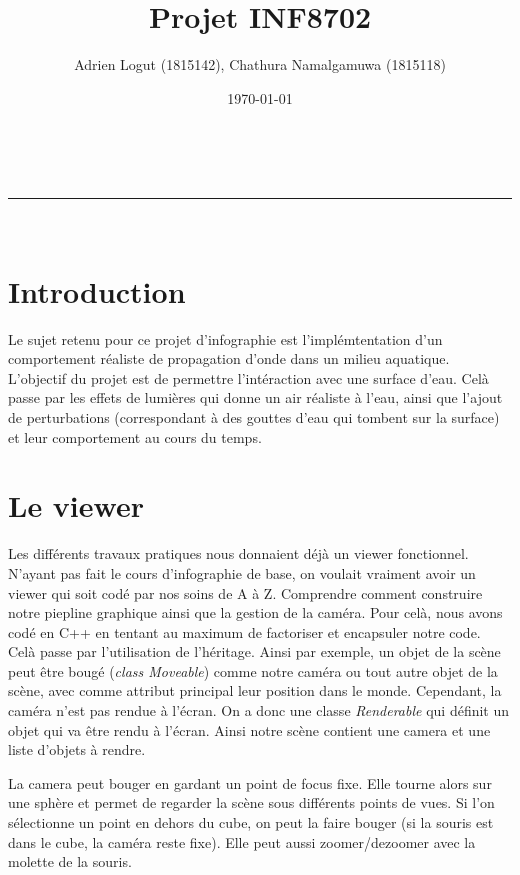 \documentclass[a4paper,11pt,leqno]{article}
\makeatletter
\newcommand{\linia}{\rule{\linewidth}{0.5pt}}
\renewcommand{\maketitle}{
\begin{center}
\vspace{2ex}
{\huge \textsc{\@title}}
\vspace{1ex}
\\
\linia\\
\@author
\vspace{4ex}
\end{center}
}
\makeatother
\begin{document}
\renewcommand{\proofname}{Preuve}

\title{Projet INF8702}

\author{Adrien Logut (1815142), Chathura Namalgamuwa (1815118)}

\date{\today}

\maketitle

\section*{Introduction}

Le sujet retenu pour ce projet d'infographie est l'implémtentation d'un comportement réaliste de propagation d'onde dans un milieu aquatique. L'objectif du projet est de permettre l'intéraction avec une surface d'eau. Celà passe par les effets de lumières qui donne un air réaliste à l'eau, ainsi que l'ajout de perturbations (correspondant à des gouttes d'eau qui tombent sur la surface) et leur comportement au cours du temps.

\section{Le viewer}

Les différents travaux pratiques nous donnaient déjà un viewer fonctionnel. N'ayant pas fait le cours d'infographie de base, on voulait vraiment avoir un viewer qui soit codé par nos soins de A à Z. Comprendre comment construire notre piepline graphique ainsi que la gestion de la caméra. Pour celà, nous avons codé en C++ en tentant au maximum de factoriser et encapsuler notre code. Celà passe par l'utilisation de l'héritage. Ainsi par exemple, un objet de la scène peut être bougé (\emph{class Moveable}) comme notre caméra ou tout autre objet de la scène, avec comme attribut principal leur position dans le monde. Cependant, la caméra n'est pas rendue à l'écran. On a donc une classe \emph{Renderable} qui définit un objet qui va être rendu à l'écran. Ainsi notre scène contient une camera et une liste d'objets à rendre.

La camera peut bouger en gardant un point de focus fixe. Elle tourne alors sur une sphère et permet de regarder la scène sous différents points de vues. Si l'on sélectionne un point en dehors du cube, on peut la faire bouger (si la souris est dans le cube, la caméra reste fixe). Elle peut aussi zoomer/dezoomer avec la molette de la souris.
\end{document}
